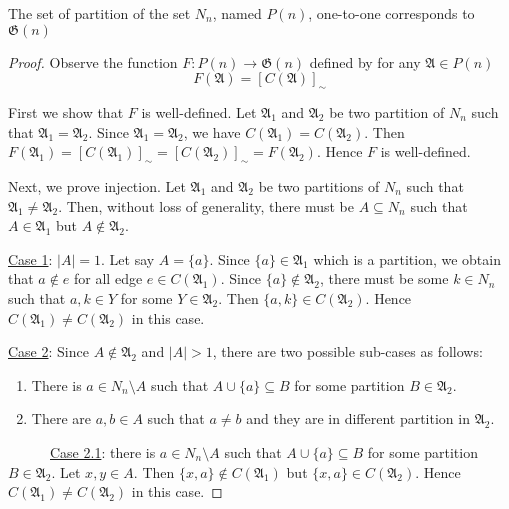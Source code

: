 \begin{lem} \label{lem1}
	The set of partition of the set $N_n$, named $P(n)$, one-to-one corresponds to $\mathfrak{G}(n)$
\end{lem}
\begin{proof}
	Observe the function $F:P(n)\to \mathfrak{G}(n)$ defined by for any $\mathfrak{A}\in P(n)$
	$$
	F(\mathfrak{A}) = \left[ C(\mathfrak{A}) \right]_\sim
	$$
	
	
	First we show that $F$ is well-defined.
	Let $\mathfrak{A}_1$ and $\mathfrak{A}_2$ be two partition of $N_n$ such that $\mathfrak{A}_1 = \mathfrak{A}_2$.
	Since $\mathfrak{A}_1 = \mathfrak{A}_2$, we have $C(\mathfrak{A}_1) = C(\mathfrak{A}_2)$.
	Then
	$F(\mathfrak{A}_1) = [C(\mathfrak{A}_1)]_\sim = [C(\mathfrak{A}_2)]_\sim = F(\mathfrak{A}_2).$
	Hence $F$ is well-defined.
	
	Next, we prove injection.
	Let $\mathfrak{A}_1$ and $\mathfrak{A}_2$ be two partitions of $N_n$ such that
	$\mathfrak{A}_1\neq\mathfrak{A}_2$.
	Then, without loss of generality, there must be $A \subseteq N_n$ such that $A \in \mathfrak{A}_1$ but $A \notin \mathfrak{A}_2$.
	
	\underline{Case 1}: $|A|=1$. Let say $A = \{a\}$.
	Since $\{a\} \in \mathfrak{A}_1$ which is a partition, we obtain that $a\notin e$ for all edge $e\in C(\mathfrak{A}_1)$.
	Since $\{a\} \notin \mathfrak{A}_2$, there must be some $k\in N_n$ such that $a,k \in Y$ for some $Y\in \mathfrak{A}_2$.
	Then $\{a,k\} \in C(\mathfrak{A}_2)$.
	Hence $C(\mathfrak{A}_1)\neq C(\mathfrak{A}_2)$ in this case.
	
	\underline{Case 2}: Since $A\notin \mathfrak{A}_2$ and $|A|>1$, there are two possible sub-cases as follows:
	\begin{enumerate}
		\item There is $a \in N_n\setminus A$ such that $A \cup \{a\}\subseteq B$ for some partition $B \in \mathfrak{A}_2$.
		\item There are $a, b \in A$ such that $a\neq b$ and they are in different partition in $\mathfrak{A}_2$.
	\end{enumerate}
	~~~~~~\underline{Case 2.1}: there is $a \in N_n\setminus A$ such that $A \cup \{a\}\subseteq B$ for some partition $B \in \mathfrak{A}_2$. Let $x,y \in A$. Then $\{x,a\}\notin C(\mathfrak{A}_1)$ but $\{x,a\}\in C(\mathfrak{A}_2)$.
	Hence $C(\mathfrak{A}_1)\neq C(\mathfrak{A}_2)$ in this case.
	

\end{proof}
